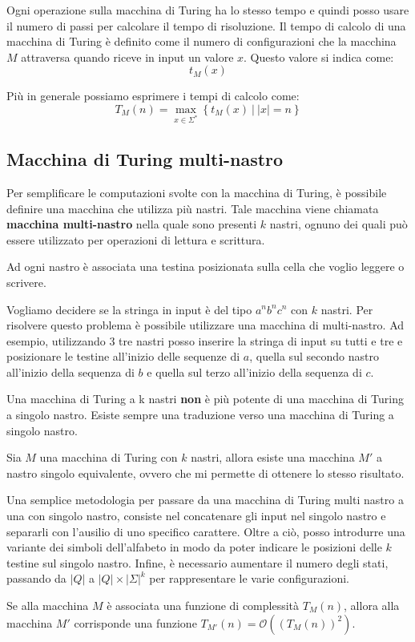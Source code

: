 Ogni operazione sulla macchina di Turing ha lo stesso tempo e quindi posso usare il numero di passi per calcolare il tempo di risoluzione. Il tempo di calcolo di una macchina di Turing è definito come il numero di configurazioni che la macchina $M$ attraversa quando riceve in input un valore $x$. Questo valore si indica come: 
\begin{equation}
    t_M(x)
\end{equation}

Più in generale possiamo esprimere i tempi di calcolo come:
\begin{equation}
    T_M(n) = \max_{x \in \Sigma^{\ast}} \left\{t_M(x) \ | \ |x| = n \right\}
\end{equation}
\subsection{Macchina di Turing multi-nastro}
Per semplificare le computazioni svolte con la macchina di Turing, è possibile definire una macchina che utilizza più nastri. Tale macchina viene chiamata \textbf{macchina multi-nastro} nella quale sono presenti $k$ nastri, ognuno dei quali può essere utilizzato per operazioni di lettura e scrittura.

Ad ogni nastro è associata una testina posizionata sulla cella che voglio leggere o scrivere. 

\begin{esempio} 
    Vogliamo decidere se la stringa in input è del tipo $a^nb^nc^n$ con $k$ nastri. Per risolvere questo problema è possibile utilizzare una macchina di multi-nastro. Ad esempio, utilizzando 3 tre nastri posso inserire la stringa di input su tutti e tre e posizionare le testine all'inizio delle sequenze di $a$, quella sul secondo nastro all'inizio della sequenza di $b$ e quella sul terzo all'inizio della sequenza di $c$.
\end{esempio}

Una macchina di Turing a k nastri \textbf{non} è più potente di una macchina di Turing a singolo nastro. Esiste sempre una traduzione verso una macchina di Turing a singolo nastro.
\begin{teorema}
    Sia $M$ una macchina di Turing con $k$ nastri, allora esiste una macchina $M'$ a nastro singolo equivalente, ovvero che mi permette di ottenere lo stesso risultato.
\end{teorema}

Una semplice metodologia per passare da una macchina di Turing multi nastro a una con singolo nastro, consiste nel concatenare gli input nel singolo nastro e separarli con l'ausilio di uno specifico carattere. Oltre a ciò, posso introdurre una variante dei simboli dell'alfabeto in modo da poter indicare le posizioni delle $k$ testine sul singolo nastro. Infine, è necessario aumentare il numero degli stati, passando da $|Q|$ a $|Q| \times |\Sigma|^k$ per rappresentare le varie configurazioni.
\begin{teorema}
    Se alla macchina $M$ è associata una funzione di complessità $T_M(n)$, allora alla macchina $M'$ corrisponde una funzione $T_{M'}(n) = \mathcal{O}((T_M(n))^2)$.
\end{teorema}

